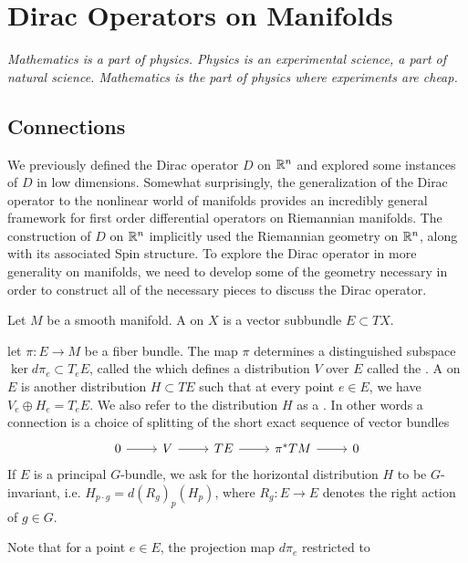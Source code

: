 \chapter{Dirac Operators on Manifolds}
%
\subsectionend $ $\\
%
\emph{Mathematics is a part of physics. Physics is an experimental science, a part of
natural science. Mathematics is the part of physics where experiments are cheap.} \\
%
%
\subsectionend
%
\section{Connections}
%
We previously defined the Dirac operator $D$ on $\mathbb{R}^n$ and explored some
instances of $D$ in low dimensions. Somewhat surprisingly, the generalization
of the Dirac operator to the nonlinear world of manifolds provides an incredibly
general framework for first order differential operators on Riemannian manifolds.
The construction of $D$ on $\mathbb{R}^n$ implicitly used the
Riemannian geometry on $\mathbb{R}^n$, along with its associated Spin structure.
To explore the Dirac operator in more generality on manifolds, we need to
develop some of the geometry necessary in order to construct all of the necessary pieces
to discuss the Dirac operator.
%
\begin{defn}
Let $M$ be a smooth manifold. A  on $X$ is a vector subbundle
$E \subset TX$.
\end{defn}
%
\begin{defn}
let $\pi : E \to M$ be a fiber bundle. The map $\pi$ determines a distinguished
subspace $\ker d\pi_e \subset T_eE$, called the 
which defines a distribution $V$ over $E$ called the .
A  on $E$ is another distribution $H \subset TE$ such that
at every point $e \in E$, we have $V_e \oplus H_e = T_eE$. We also refer to the
distribution $H$ as a . In other words a connection
is a choice of splitting of the short exact sequence of vector bundles
\[\begin{tikzcd}
0 \ar[r] & V \ar[r] & TE \ar[r] & \pi^*TM \ar[r] & 0
\end{tikzcd}\]
If $E$ is a principal $G$-bundle, we ask for the horizontal distribution $H$
to be $G$-invariant, i.e. $H_{p \cdot g} = d(R_g)_p(H_p)$, where $R_g : E \to E$
denotes the right action of $g \in G$.
\end{defn}
%
Note that for a point $e \in E$, the projection map $d\pi_e$ restricted to
